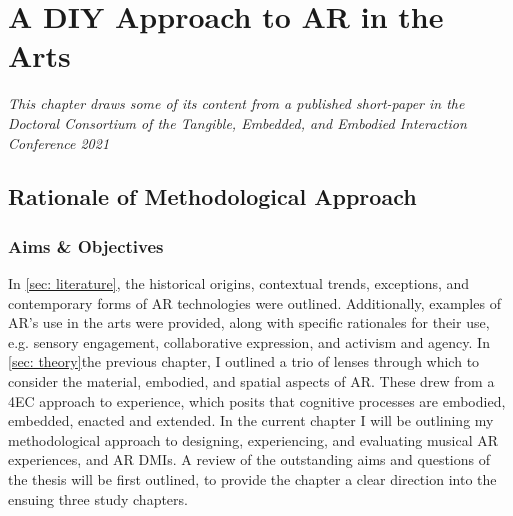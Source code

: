 \chapter{A DIY Approach to AR in the Arts}
\label{sec: method}
\epigraph{\emph{This chapter draws some of its content from a published short-paper in the Doctoral Consortium of the Tangible, Embedded, and Embodied Interaction Conference 2021}}{\citep[]{bilbow2021b}}



\section{Rationale of Methodological Approach}\label{sec: method-outline} %
\subsection{Aims \& Objectives}\label{sec: method-outline-aims}
In \autoref{sec: literature}, the historical origins, contextual trends, exceptions, and contemporary forms of AR technologies were outlined. Additionally, examples of AR's use in the arts were provided, along with specific rationales for their use, e.g. sensory engagement, collaborative expression, and activism and agency. In \autoref{sec: theory}{the previous chapter}, I outlined a trio of lenses through which to consider the material, embodied, and spatial aspects of AR. These drew from a 4EC approach to experience, which posits that cognitive processes are embodied, embedded, enacted and extended. In the current chapter I will be outlining my methodological approach to designing, experiencing, and evaluating musical AR experiences, and AR DMIs. A review of the outstanding aims and questions of the thesis will be first outlined, to provide the chapter a clear direction into the ensuing three study chapters.

\begin{enumerate}
    \RQmedium
    \RQexperience
    \RQfuture
\end{enumerate}



